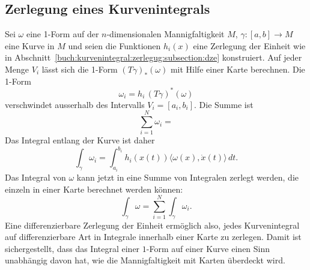 \subsection{Zerlegung eines Kurvenintegrals}
Sei $\omega$ eine 1-Form auf der $n$-dimensionalen Mannigfaltigkeit $M$,
$\gamma\colon[a,b]\to M$ eine Kurve in $M$
und seien die Funktionen $h_i(x)$ eine Zerlegung der Einheit wie in
Abschnitt~\ref{buch:kurvenintegral:zerlegug:subsection:dze} konstruiert.
Auf jeder Menge $V_i$ lässt sich die 1-Form $(T\gamma)_*(\omega)$ mit
Hilfe einer Karte berechnen.
Die 1-Form
\[
\omega_i
=
h_i\, (T\gamma)^*(\omega)
\]
verschwindet ausserhalb des Intervalls $V_i=[a_i,b_i]$.
Die Summe ist
\[
\sum_{i=1}^N \omega_i
=
\]
Das Integral entlang der Kurve ist daher
\[
\int_\gamma \omega_i
=
\int_{a_i}^{b_i} h_i(x(t)) \langle \omega(x), \dot{x}(t)\rangle\,dt.
\]
Das Integral von $\omega$ kann jetzt in eine Summe von Integralen
zerlegt werden, die einzeln in einer Karte berechnet werden können:
\[
\int_\gamma\omega
=
\sum_{i=1}^N \int_{\gamma} \omega_i.
\]
Eine differenzierbare Zerlegung der Einheit ermöglich also, jedes
Kurvenintegral auf differenzierbare Art in Integrale innerhalb
einer Karte zu zerlegen.
Damit ist sichergestellt, dass das Integral einer $1$-Form
auf einer Kurve einen Sinn unabhängig davon hat, wie die Mannigfaltigkeit
mit Karten überdeckt wird.

